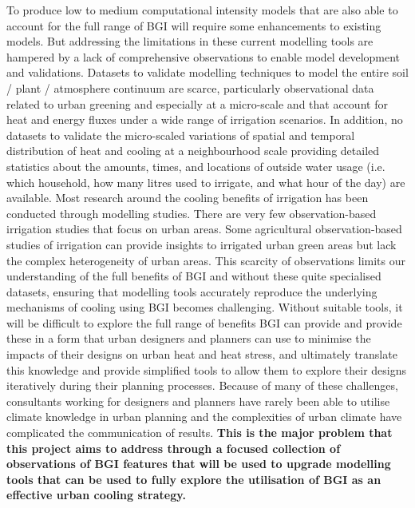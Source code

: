 To produce low to medium computational intensity models that are also able to account for the full range of BGI will require some enhancements to existing models. But addressing the limitations in these current modelling tools are hampered by a lack of comprehensive observations to enable model development and validations. Datasets to validate modelling techniques to model the entire soil / plant / atmosphere continuum are scarce\cite{Pataki2013}, particularly observational data related to urban greening and especially at a micro-scale and that account for heat and energy fluxes under a wide range of irrigation scenarios. In addition, no datasets to validate the micro-scaled variations of spatial and temporal distribution of heat and cooling at a neighbourhood scale providing detailed statistics about the amounts, times, and locations of outside water usage (i.e. which household, how many litres used to irrigate, and what hour of the day) are available. Most research around the cooling benefits of irrigation has been conducted through modelling studies\cite{Kanamaru2008,Yang2015a,Broadbent2018a}. There are very few observation-based irrigation studies that focus on urban areas\cite{Broadbent2017a}. Some agricultural observation-based studies of irrigation\cite{Chen2018b} can provide insights to irrigated urban green areas but lack the complex heterogeneity of urban areas. This scarcity of observations limits our understanding of the full benefits of BGI and without these quite specialised datasets, ensuring that modelling tools accurately reproduce the underlying mechanisms of cooling using BGI becomes challenging. Without suitable tools, it will be difficult to explore the full range of benefits BGI can provide and provide these in a form that urban designers and planners can use to minimise the impacts of their designs on urban heat and heat stress, and ultimately translate this knowledge and provide simplified tools to allow them to explore their designs iteratively during their planning processes. Because of many of these challenges, consultants working for designers and planners have rarely been able to utilise climate knowledge in urban planning\cite{Elasson2000} and the complexities of urban climate have complicated the communication of results\cite{Oke2006}. \textbf{This is the major problem that this project aims to address through a focused collection of observations of BGI features that will be used to upgrade modelling tools that can be used to fully explore the utilisation of BGI as an effective urban cooling strategy.}

